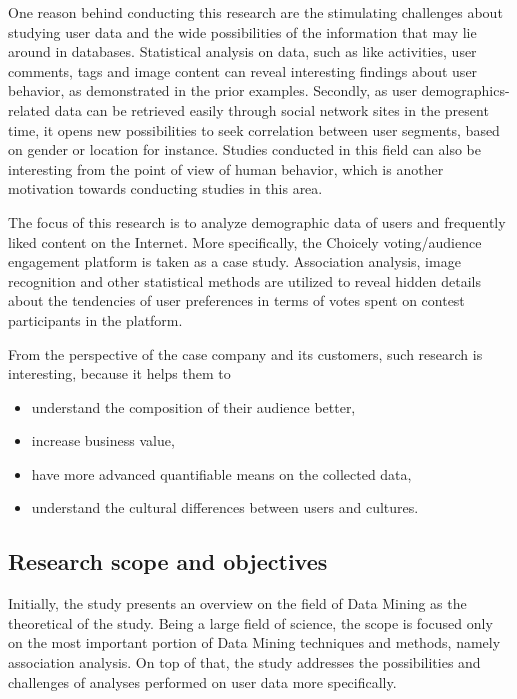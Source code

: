     One reason behind conducting this research are the stimulating challenges about studying user data and the wide possibilities of the information that may lie around in databases. Statistical analysis on data, such as like activities, user comments, tags and image content can reveal interesting findings about user behavior, as demonstrated in the prior examples. Secondly, as user demographics-related data can be retrieved easily through social network sites in the present time, it opens new possibilities to seek correlation between user segments, based on gender or location for instance. Studies conducted in this field can also be interesting from the point of view of human behavior, which is another motivation towards conducting studies in this area. 

    The focus of this research is to analyze demographic data of users and frequently liked content on the Internet. More specifically, the Choicely voting/audience engagement platform is taken as a case study. Association analysis, image recognition and other statistical methods are utilized to reveal hidden details about the tendencies of user preferences in terms of votes spent on contest participants in the platform.   

    From the perspective of the case company and its customers, such research is interesting, because it helps them to 

    \begin{itemize}
        \item understand the composition of their audience better,
        \item increase business value,
        \item have more advanced quantifiable means on the collected data,
        \item understand the cultural differences between users and cultures. 
    \end{itemize} 

\subsection{Research scope and objectives}
    Initially, the study presents an overview on the field of Data Mining as the theoretical of the study. Being a large field of science, the scope is focused only on the most important portion of Data Mining techniques and methods, namely association analysis. On top of that, the study addresses the possibilities and challenges of analyses performed on user data more specifically.   

